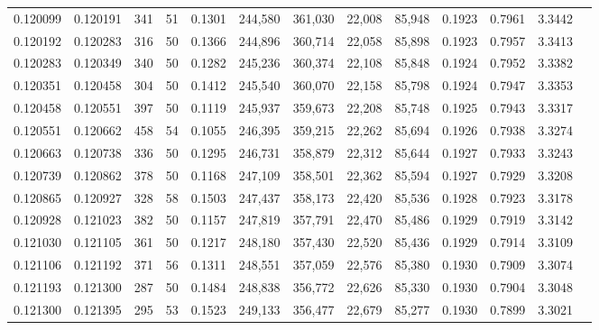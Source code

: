 \begin{tabular}{rrrrrrrrrrrrr}
0.120099 & 0.120191 &   341 &  51 &                                     0.1301 & 244,580 & 361,030 &  22,008 &  85,948 & 0.1923 & 0.7961 & 3.3442 \\
0.120192 & 0.120283 &   316 &  50 &                                     0.1366 & 244,896 & 360,714 &  22,058 &  85,898 & 0.1923 & 0.7957 & 3.3413 \\
0.120283 & 0.120349 &   340 &  50 &                                     0.1282 & 245,236 & 360,374 &  22,108 &  85,848 & 0.1924 & 0.7952 & 3.3382 \\
0.120351 & 0.120458 &   304 &  50 &                                     0.1412 & 245,540 & 360,070 &  22,158 &  85,798 & 0.1924 & 0.7947 & 3.3353 \\
0.120458 & 0.120551 &   397 &  50 &                                     0.1119 & 245,937 & 359,673 &  22,208 &  85,748 & 0.1925 & 0.7943 & 3.3317 \\
0.120551 & 0.120662 &   458 &  54 &                                     0.1055 & 246,395 & 359,215 &  22,262 &  85,694 & 0.1926 & 0.7938 & 3.3274 \\
0.120663 & 0.120738 &   336 &  50 &                                     0.1295 & 246,731 & 358,879 &  22,312 &  85,644 & 0.1927 & 0.7933 & 3.3243 \\
0.120739 & 0.120862 &   378 &  50 &                                     0.1168 & 247,109 & 358,501 &  22,362 &  85,594 & 0.1927 & 0.7929 & 3.3208 \\
0.120865 & 0.120927 &   328 &  58 &                                     0.1503 & 247,437 & 358,173 &  22,420 &  85,536 & 0.1928 & 0.7923 & 3.3178 \\
0.120928 & 0.121023 &   382 &  50 &                                     0.1157 & 247,819 & 357,791 &  22,470 &  85,486 & 0.1929 & 0.7919 & 3.3142 \\
0.121030 & 0.121105 &   361 &  50 &                                     0.1217 & 248,180 & 357,430 &  22,520 &  85,436 & 0.1929 & 0.7914 & 3.3109 \\
0.121106 & 0.121192 &   371 &  56 &                                     0.1311 & 248,551 & 357,059 &  22,576 &  85,380 & 0.1930 & 0.7909 & 3.3074 \\
0.121193 & 0.121300 &   287 &  50 &                                     0.1484 & 248,838 & 356,772 &  22,626 &  85,330 & 0.1930 & 0.7904 & 3.3048 \\
0.121300 & 0.121395 &   295 &  53 &                                     0.1523 & 249,133 & 356,477 &  22,679 &  85,277 & 0.1930 & 0.7899 & 3.3021 \\

\end{tabular}
